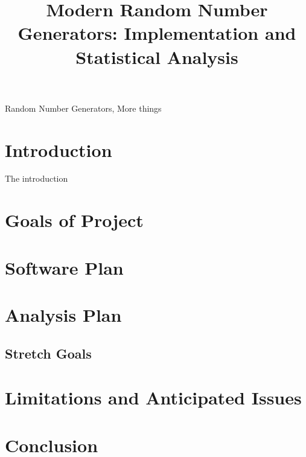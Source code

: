 \documentclass[conference,11pt]{IEEEtran}
\begin{document}
\title{Modern Random Number Generators: Implementation and Statistical Analysis}

\author{
\and
{}
\and
{}
}

\maketitle

\begin{abstract}

\end{abstract}

\begin{IEEEkeywords}
Random Number Generators, More things
\end{IEEEkeywords}
\section{Introduction}
\label{sec:introduction}
The introduction

\section{Goals of Project}
\label{sec:goals}


\section{Software Plan}
\label{sec:software_plan}


\section{Analysis Plan}
\label{sec:analysis_plan}


\subsection{Stretch Goals}
\label{sec:stretch_goals}


\section{Limitations and Anticipated Issues}
\label{sec:issues}


\section{Conclusion}
\label{sec:conclusion}




\end{document}
